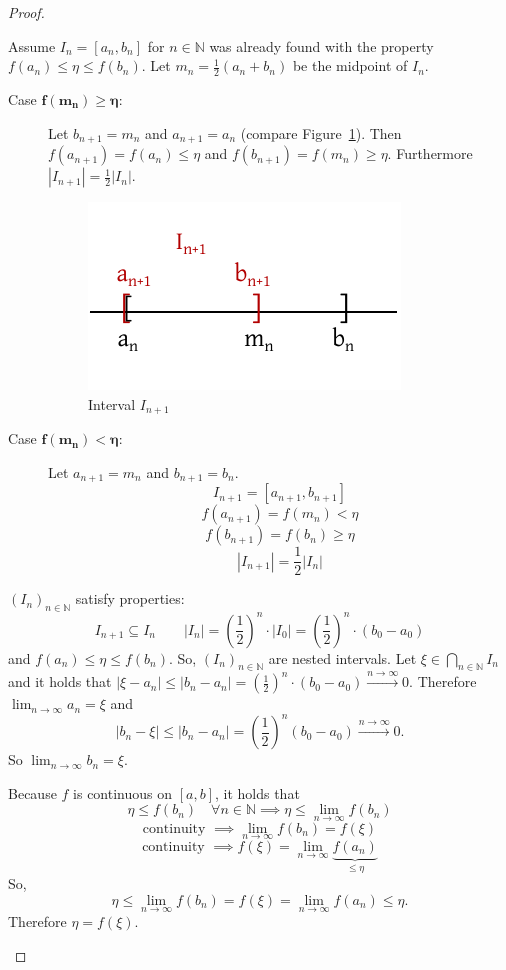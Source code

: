 \documentclass[a4paper,landscape,twocolumn]{article}
\theoremstyle{definition}
\newcommand\abs[1]{\left|#1\right|}
\newcommand\seq[1]{{\left(#1\right)}_{n \in \mathbb N}}
\begin{document}
\begin{proof}
\begin{description}
      Assume $I_n = [a_n, b_n]$ for $n \in \mathbb N$ was already found with the property $f(a_n) \leq \eta \leq f(b_n)$.
      Let $m_n = \frac12 (a_n + b_n)$ be the midpoint of $I_n$.
      \begin{description}
        \item[Case $\mathbf{f(m_n) \geq \eta}$:]
          Let $b_{n+1} = m_n$ and $a_{n+1} = a_n$ (compare Figure~\ref{img:am_bm}).
          Then $f(a_{n+1}) = f(a_n) \leq \eta$ and $f(b_{n+1}) = f(m_n) \geq \eta$.
          Furthermore $\abs{I_{n+1}} = \frac12 \abs{I_n}$.
          \begin{figure}[!h]
            \begin{center}
              \includegraphics{img/am_bm.pdf}
              \caption{Interval $I_{n+1}$}
              \label{img:am_bm}
            \end{center}
          \end{figure}
        \item[Case $\mathbf{f(m_n) < \eta}$:]
          Let $a_{n+1} = m_n$ and $b_{n + 1} = b_n$.
          \[ I_{n+1} = [a_{n+1}, b_{n+1}] \]
          \[ f(a_{n+1}) = f(m_n) < \eta \]
          \[ f(b_{n+1}) = f(b_n) \geq \eta \]
          \[ \abs{I_{n+1}} = \frac12 \abs{I_n} \]
      \end{description}
      $\seq{I_n}$ satisfy properties:
      \[ I_{n+1} \subseteq I_n \qquad \abs{I_n} = \left(\frac12\right)^n \cdot \abs{I_0} = \left(\frac12\right)^n \cdot (b_0 - a_0) \]
      and $f(a_n) \leq \eta \leq f(b_n)$. So, $\seq{I_n}$ are nested intervals.
      Let $\xi \in \bigcap_{n\in\mathbb N} I_n$ and it holds that $\abs{\xi - a_n} \leq \abs{b_n - a_n} = \left(\frac12\right)^n \cdot (b_0 - a_0) \xrightarrow{n \to \infty} 0$.
      Therefore $\lim_{n\to\infty} a_n = \xi$ and
      \[
        \abs{b_n - \xi} \leq \abs{b_n - a_n}
        = \left(\frac12\right)^n (b_0 - a_0) \xrightarrow{n \to \infty} 0.
      \]
      So $\lim_{n\to\infty} b_n = \xi$.

      Because $f$ is continuous on $[a, b]$, it holds that
      \[ \eta \leq f(b_n) \quad\forall n \in \mathbb N \implies \eta \leq \lim_{n\to\infty} f(b_n) \]
      \[ \text{continuity } \implies \lim_{n\to\infty} f(b_n) = f(\xi) \]
      \[ \text{continuity } \implies f(\xi) = \lim_{n\to\infty} \underbrace{f(a_n)}_{\leq \eta} \]
      So,
      \[ \eta \leq \lim_{n\to\infty} f(b_n) = f(\xi) = \lim_{n\to\infty} f(a_n) \leq \eta. \]
      Therefore $\eta = f(\xi)$.
  \end{description}
\end{proof}
\end{document}
